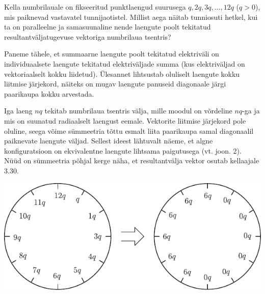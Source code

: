 
Kella numbrilauale on fikseeritud punktlaengud suurusega $q, 2q, 3q, \ldots, 12q$ ($q > 0$), mis paiknevad vastavatel tunnijaotistel. Millist aega näitab tunniosuti hetkel, kui ta on paralleelne ja samasuunaline nende laengute poolt tekitatud resultantväljatugevuse vektoriga numbrilaua tsentris?

\hint
Paneme tähele, et summaarne laengute poolt tekitatud elektriväli on individuaalsete laengute tekitatud elektriväljade summa (kus elektriväljad on vektoriaalselt kokku liidetud). Ülesannet lihtsustab oluliselt laengute kokku liitmise järjekord, näiteks on mugav laengute panuseid diagonaale järgi paarikaupa kokku arvestada.

\solu
Iga laeng $nq$ tekitab numbrilaua tsentris välja, mille moodul on võrdeline $nq$-ga ja mis on suunatud radiaalselt laengust eemale. Vektorite liitmise järjekord pole oluline, seega võime sümmeetria tõttu esmalt liita paarikaupa samal diagonaalil paiknevate laengute väljad. Sellest ideest lähtuvalt näeme, et algne konfiguratsioon on ekvivalentne laengute lihtsama paigutusega (vt. joon. 2). Nüüd on sümmeetria põhjal kerge näha, et resultantvälja vektor osutab kellaajale 3.30.
\begin{center}
	\includegraphics[width=0.7\linewidth]{2004-lahg-07-lah.pdf}
\end{center}
\probend